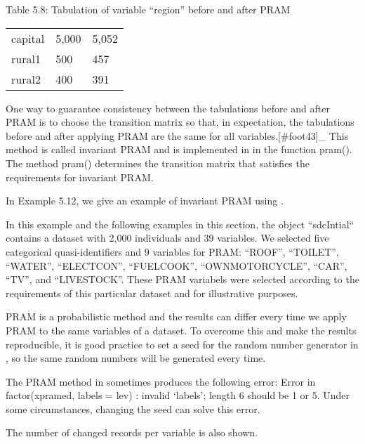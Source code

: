 \documentclass[letterpaper,10pt,english]{sphinxmanual}
\begin{document}
Table 5.8: Tabulation of variable “region” before and after PRAM


\begin{savenotes}\sphinxattablestart
\centering
\begin{tabulary}{\linewidth}[t]{|T|T|T|}
\hline
\sphinxstyletheadfamily 
{}
&\sphinxstyletheadfamily 
{}
&\sphinxstyletheadfamily 
{}
\\
\hline
capital
&
5,000
&
5,052
\\
\hline
rural1
&
500
&
457
\\
\hline
rural2
&
400
&
391
\\
\hline
\end{tabulary}
\par
\sphinxattableend\end{savenotes}

One way to guarantee consistency between the tabulations before and
after PRAM is to choose the transition matrix so that, in expectation,
the tabulations before and after applying PRAM are the same for all
variables.{[}\#foot43{]}\_ This method is called invariant PRAM
and is implemented in  in the function pram(). The method
pram() determines the transition matrix that satisfies the requirements
for invariant PRAM. 

In Example 5.12, we give an example of invariant PRAM using
. %
\begin{footnote}[11]\sphinxAtStartFootnote
In this example and the following examples in this section, the
 object “sdcIntial“ contains a dataset with 2,000
individuals and 39 variables. We selected five categorical
quasi-identifiers and 9 variables for PRAM: “ROOF”, “TOILET”,
“WATER”, “ELECTCON”, “FUELCOOK”, “OWNMOTORCYCLE”, “CAR”, “TV”, and
“LIVESTOCK”. These PRAM variabels were selected according to the
requirements of this particular dataset and for illustrative
purposes.
%
\end{footnote} PRAM is a probabilistic method and the
results can differ every time we apply PRAM to the same variables of a
dataset. To overcome this and make the results reproducible, it is good
practice to set a seed for the random number generator in , so the
same random numbers will be generated every time. %
\begin{footnote}[12]\sphinxAtStartFootnote
The PRAM method in  sometimes produces the following
error: Error in factor(xpramed, labels = lev) : invalid ‘labels’;
length 6 should be 1 or 5. Under some circumstances, changing the
seed can solve this error.
%
\end{footnote}
The number of changed records per variable is also shown.
\end{document}
